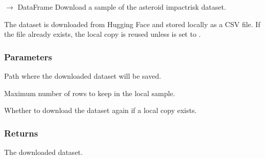 \documentclass[letterpaper,10pt,english]{sphinxmanual}
\begin{document}
\begin{fulllineitems}
\label{\detokenize{modules:asteroid_impact.dataset.download_dataset}}
\pysigstartsignatures
\pysiglinewithargsret
{}
{\sphinxparamcomma {}\sphinxparamcomma {}}
{{ $\rightarrow$ DataFrame}}
\pysigstopsignatures
\sphinxAtStartPar
Download a sample of the asteroid impact\sphinxhyphen{}risk dataset.

\sphinxAtStartPar
The dataset is downloaded from Hugging Face and stored locally as a CSV
file. If the file already exists, the local copy is reused unless
 is set to .


\subsubsection{Parameters}
\label{\detokenize{modules:parameters}}\begin{description}
\sphinxAtStartPar
Path where the downloaded dataset will be saved.

\sphinxAtStartPar
Maximum number of rows to keep in the local sample.

\sphinxAtStartPar
Whether to download the dataset again if a local copy exists.

\end{description}


\subsubsection{Returns}
\label{\detokenize{modules:returns}}\begin{description}
\sphinxAtStartPar
The downloaded dataset.

\end{description}

\end{fulllineitems}
\end{document}
